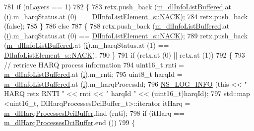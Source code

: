 \begin{DoxyCode}
781       \textcolor{keywordflow}{if} (nLayers == 1)
782         \{
783           retx.push\_back (\hyperlink{classns3_1_1TdMtFfMacScheduler_a4237ad4223d377a1c9963a904acbe4ad}{m\_dlInfoListBuffered}.at (\hyperlink{bernuolliDistribution_8m_a6f6ccfcf58b31cb6412107d9d5281426}{i}).m\_harqStatus.at (0) == 
      \hyperlink{structns3_1_1DlInfoListElement__s_a3e55b89f756b7bd8909c8116a202a17aaf90e76e67c86729b4ee21927b7fb1770}{DlInfoListElement\_s::NACK});
784           retx.push\_back (\textcolor{keyword}{false});
785         \}
786       \textcolor{keywordflow}{else}
787         \{
788           retx.push\_back (\hyperlink{classns3_1_1TdMtFfMacScheduler_a4237ad4223d377a1c9963a904acbe4ad}{m\_dlInfoListBuffered}.at (\hyperlink{bernuolliDistribution_8m_a6f6ccfcf58b31cb6412107d9d5281426}{i}).m\_harqStatus.at (0) == 
      \hyperlink{structns3_1_1DlInfoListElement__s_a3e55b89f756b7bd8909c8116a202a17aaf90e76e67c86729b4ee21927b7fb1770}{DlInfoListElement\_s::NACK});
789           retx.push\_back (\hyperlink{classns3_1_1TdMtFfMacScheduler_a4237ad4223d377a1c9963a904acbe4ad}{m\_dlInfoListBuffered}.at (\hyperlink{bernuolliDistribution_8m_a6f6ccfcf58b31cb6412107d9d5281426}{i}).m\_harqStatus.at (1) == 
      \hyperlink{structns3_1_1DlInfoListElement__s_a3e55b89f756b7bd8909c8116a202a17aaf90e76e67c86729b4ee21927b7fb1770}{DlInfoListElement\_s::NACK});
790         \}
791       \textcolor{keywordflow}{if} (retx.at (0) || retx.at (1))
792         \{
793           \textcolor{comment}{// retrieve HARQ process information}
794           uint16\_t rnti = \hyperlink{classns3_1_1TdMtFfMacScheduler_a4237ad4223d377a1c9963a904acbe4ad}{m\_dlInfoListBuffered}.at (\hyperlink{bernuolliDistribution_8m_a6f6ccfcf58b31cb6412107d9d5281426}{i}).m\_rnti;
795           uint8\_t harqId = \hyperlink{classns3_1_1TdMtFfMacScheduler_a4237ad4223d377a1c9963a904acbe4ad}{m\_dlInfoListBuffered}.at (\hyperlink{bernuolliDistribution_8m_a6f6ccfcf58b31cb6412107d9d5281426}{i}).m\_harqProcessId;
796           \hyperlink{group__logging_gafbd73ee2cf9f26b319f49086d8e860fb}{NS\_LOG\_INFO} (\textcolor{keyword}{this} << \textcolor{stringliteral}{" HARQ retx RNTI "} << rnti << \textcolor{stringliteral}{" harqId "} << (uint16\_t)harqId);
797           std::map <uint16\_t, DlHarqProcessesDciBuffer\_t>::iterator itHarq = 
      \hyperlink{classns3_1_1TdMtFfMacScheduler_ac1da1d9622aa19e81514421bd668bd63}{m\_dlHarqProcessesDciBuffer}.find (rnti);
798           \textcolor{keywordflow}{if} (itHarq == \hyperlink{classns3_1_1TdMtFfMacScheduler_ac1da1d9622aa19e81514421bd668bd63}{m\_dlHarqProcessesDciBuffer}.end ())
799             \{

\end{DoxyCode}
